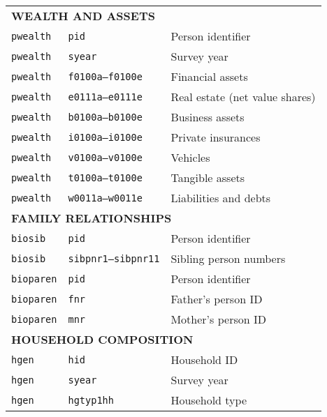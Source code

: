 {\begin{longtable}{lll}
\midrule
\multicolumn{3}{l}{\textbf{WEALTH AND ASSETS}} \\
\texttt{pwealth} & \texttt{pid} & Person identifier \\
\texttt{pwealth} & \texttt{syear} & Survey year \\
\texttt{pwealth} & \texttt{f0100a--f0100e} & Financial assets \\
\texttt{pwealth} & \texttt{e0111a--e0111e} & Real estate (net value shares) \\
\texttt{pwealth} & \texttt{b0100a--b0100e} & Business assets \\
\texttt{pwealth} & \texttt{i0100a--i0100e} & Private insurances \\
\texttt{pwealth} & \texttt{v0100a--v0100e} & Vehicles \\
\texttt{pwealth} & \texttt{t0100a--t0100e} & Tangible assets \\
\texttt{pwealth} & \texttt{w0011a--w0011e} & Liabilities and debts \\

\midrule
\multicolumn{3}{l}{\textbf{FAMILY RELATIONSHIPS}} \\
\texttt{biosib} & \texttt{pid} & Person identifier \\
\texttt{biosib} & \texttt{sibpnr1--sibpnr11} & Sibling person numbers \\
\texttt{bioparen} & \texttt{pid} & Person identifier \\
\texttt{bioparen} & \texttt{fnr} & Father’s person ID \\
\texttt{bioparen} & \texttt{mnr} & Mother’s person ID \\

\midrule
\multicolumn{3}{l}{\textbf{HOUSEHOLD COMPOSITION}} \\
\texttt{hgen} & \texttt{hid} & Household ID \\
\texttt{hgen} & \texttt{syear} & Survey year \\
\texttt{hgen} & \texttt{hgtyp1hh} & Household type \\

\end{longtable}
}

